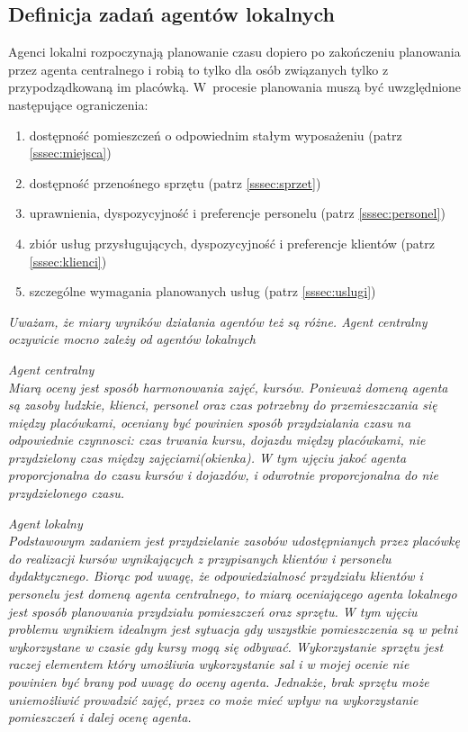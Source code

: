 \subsection{Definicja zadań agentów lokalnych}\label{ssec:zadaniaLokalny}
Agenci lokalni rozpoczynają planowanie czasu dopiero po zakończeniu planowania przez
agenta centralnego i robią to tylko dla osób związanych tylko z przypodządkowaną im placówką.
W~procesie planowania muszą być uwzględnione następujące ograniczenia:
\begin{enumerate}
	\item{dostępność pomieszczeń o odpowiednim stałym wyposażeniu (patrz \ref{sssec:miejsca})}
	\item{dostępność przenośnego sprzętu (patrz \ref{sssec:sprzet})}
	\item{uprawnienia, dyspozycyjność i preferencje personelu (patrz \ref{sssec:personel})}
	\item{zbiór usług przysługujących, dyspozycyjność
		i preferencje klientów (patrz \ref{sssec:klienci})}
	\item{szczególne wymagania planowanych usług (patrz \ref{sssec:uslugi})}
\end{enumerate}

\emph{Uważam, że miary wyników działania agentów też są różne.
	Agent centralny oczywicie mocno zależy od agentów lokalnych}

\emph{Agent centralny}\\
\emph{Miarą oceny jest sposób harmonowania zajęć, kursów. Ponieważ domeną agenta są zasoby ludzkie,
	klienci, personel oraz czas potrzebny do przemieszczania się między placówkami, oceniany być powinien
	sposób przydzialania czasu na odpowiednie czynnosci: czas trwania kursu, dojazdu między placówkami,
	nie przydzielony czas między zajęciami(okienka). W tym ujęciu jakoć agenta proporcjonalna do czasu kursów
	i dojazdów, i odwrotnie proporcjonalna do nie przydzielonego czasu.}

\emph{Agent lokalny} \\
\emph{Podstawowym zadaniem jest przydzielanie zasobów udostępnianych przez placówkę do realizacji kursów
	wynikających z przypisanych klientów i personelu dydaktycznego. Biorąc pod uwagę, że odpowiedzialnosć
	przydziału klientów i personelu jest domeną agenta centralnego, to miarą oceniającego agenta lokalnego
	jest sposób planowania przydziału pomieszczeń oraz sprzętu. W tym ujęciu problemu wynikiem idealnym jest
	sytuacja gdy wszystkie pomieszczenia są w pełni wykorzystane w czasie gdy kursy mogą się odbywać.
	Wykorzystanie sprzętu jest raczej elementem który umożliwia wykorzystanie sal i w mojej ocenie nie powinien
	być brany pod uwagę do oceny agenta. Jednakże, brak sprzętu może uniemożliwić prowadzić zajęć, przez co może
	mieć wpływ na wykorzystanie pomieszczeń i dalej ocenę agenta.}

